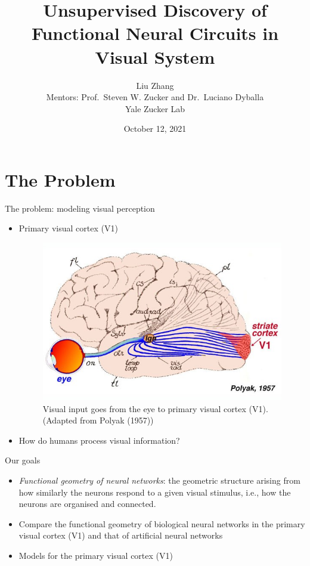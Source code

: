 \documentclass[xcolor={dvipsnames,svgnames}]{beamer}
\title[Functional Neural Circuits in Visual System]{Unsupervised Discovery of Functional Neural Circuits in Visual System}
\author{Liu Zhang\\ Mentors: Prof.~Steven W. Zucker and Dr.~Luciano Dyballa\\ Yale Zucker Lab}
\date{October 12, 2021}
\begin{document}
\begin{frame}
\titlepage
\end{frame}

\section{The Problem}
\begin{frame}{The problem: modeling visual perception}
\begin{itemize}
    \item Primary visual cortex (V1)
    \begin{figure}[H]
            \centering
                \includegraphics[width=0.25
                \textwidth]{figures-models/v1.jpg}
                \caption{Visual input goes from the eye to primary visual cortex (V1).\\ (Adapted from Polyak (1957))}
            \end{figure}     
        \item How do humans process visual information? 
\end{itemize}
\end{frame}


\begin{frame}{Our goals}
       \begin{itemize}
       \item \textit{Functional geometry of neural networks}: the geometric structure arising from how similarly the neurons respond to a given visual stimulus, i.e., how the neurons are organised and connected.
        \item Compare the functional geometry of biological neural networks in the primary visual cortex (V1) and that of artificial neural networks
        \item Models for the primary visual cortex (V1)
    \end{itemize}
\end{frame}
\end{document}
